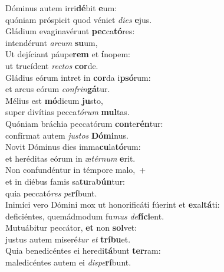 \oddverse Dóminus autem irri\textbf{dé}bit \textbf{e}um:~\*\\
\oddverse quóniam próspicit quod véniet \textit{di}\textit{es} \textbf{e}jus.\\
\evenverse Gládium evaginavérunt \textbf{pec}ca\textbf{tó}res:~\*\\
\evenverse intendérunt \textit{ar}\textit{cum} \textbf{su}um,\\
\oddverse Ut dejíciant páupe\textbf{rem} et \textbf{í}nopem:~\*\\
\oddverse ut trucídent \textit{re}\textit{ctos} \textbf{cor}de.\\
\evenverse Gládius eórum intret in \textbf{cor}da i\textbf{psó}rum:~\*\\
\evenverse et arcus eórum \textit{con}\textit{frin}\textbf{gá}tur.\\
\oddverse Mélius est \textbf{mó}dicum \textbf{ju}sto,~\*\\
\oddverse super divítias pecca\textit{tó}\textit{rum} \textbf{mul}tas.\\
\evenverse Quóniam bráchia peccatórum \textbf{con}te\textbf{rén}tur:~\*\\
\evenverse confírmat autem \textit{ju}\textit{stos} \textbf{Dó}\textbf{mi}nus.\\
\oddverse Novit Dóminus dies imma\textbf{cu}la\textbf{tó}rum:~\*\\
\oddverse et heréditas eórum in æ\textit{tér}\textit{num} \textbf{e}rit.\\
\evenverse Non confundéntur in témpore malo,~+\\
\evenverse  et in diébus famis sa\textbf{tu}ra\textbf{bún}tur:~\*\\
\evenverse quia peccató\textit{res} \textit{pe}\textbf{rí}bunt.\\
\oddverse Inimíci vero Dómini mox ut honorificáti fúerint et \textbf{e}xal\textbf{tá}ti:~\*\\
\oddverse deficiéntes, quemádmodum fu\textit{mus} \textit{de}\textbf{fí}\textbf{ci}ent.\\
\evenverse Mutuábitur peccátor, \textbf{et} non \textbf{sol}vet:~\*\\
\evenverse justus autem miseré\textit{tur} \textit{et} \textbf{trí}\textbf{bu}et.\\
\oddverse Quia benedicéntes ei heredi\textbf{tá}bunt \textbf{ter}ram:~\*\\
\oddverse maledicéntes autem ei \textit{di}\textit{spe}\textbf{rí}bunt.\\
